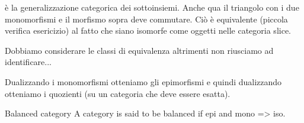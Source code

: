 \documentclass[a4paper]{article}
\begin{document}
è la generalizzazione categorica dei sottoinsiemi.
Anche qua il triangolo con i due monomorfismi e il morfismo sopra deve commutare.
Ciò è equivalente (piccola verifica esericizio)
al fatto che siano isomorfe come oggetti nelle categoria slice.

Dobbiamo considerare le classi di equivalenza altrimenti non riusciamo
ad identificare...

Dualizzando i monomorfismi otteniamo gli epimorfismi e quindi dualizzando
otteniamo i quozienti (su un categoria che deve essere esatta).

\begin{snippetdefinition}{Balanced category}
    A category is said to be balanced
    if epi and mono => iso.
\end{snippetdefinition}






\end{document}

